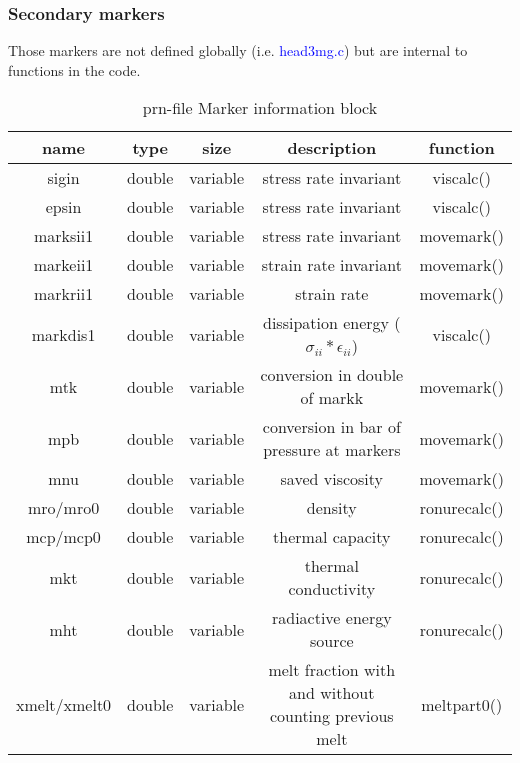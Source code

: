 \subsubsection{Secondary markers}
Those markers are not defined globally (i.e. \textcolor{blue}{head3mg.c}) but are internal to functions in the code.

\begin{table}[H]
\small
\centering
\begin{tabular}{c c c c c}
\toprule
name & type & size & description & function \\  
\midrule
sigin & double & variable & stress rate invariant & viscalc() \\

epsin & double & variable & stress rate invariant & viscalc() \\
 
marksii1 & double & variable & stress rate invariant & movemark() \\ 

markeii1 & double & variable & strain rate invariant & movemark() \\ 

markrii1 & double & variable & strain rate & movemark() \\ 

markdis1 & double & variable & dissipation energy ($\sigma_{ii}*\epsilon_{ii}$) & viscalc() \\ 

mtk & double & variable & conversion in double of markk & movemark() \\ 

mpb & double & variable & conversion in bar of pressure at markers & movemark() \\ 

mnu & double & variable & saved viscosity & movemark() \\ 

mro/mro0 & double & variable & density & ronurecalc() \\

mcp/mcp0 & double & variable & thermal capacity & ronurecalc() \\

mkt & double & variable & thermal conductivity & ronurecalc() \\

mht & double & variable & radiactive energy source & ronurecalc() \\

xmelt/xmelt0 & double & variable & melt fraction with and without counting previous melt & meltpart0() \\
\bottomrule
\end{tabular}
\caption{prn-file Marker information block}
\label{tbl:prn_marker_info}
\end{table}